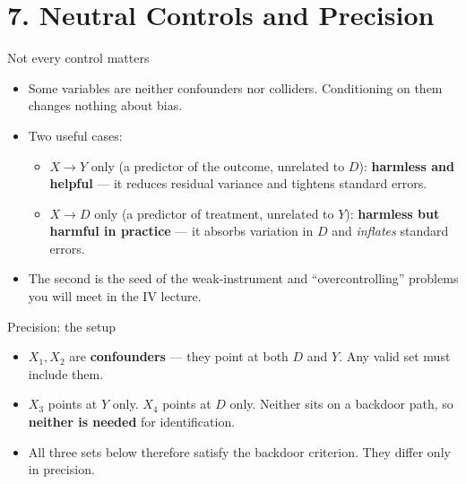 \documentclass[
  11pt,
  ignorenonframetext,
  aspectratio=169,
]{beamer}
\providecommand{\tightlist}{%
  \setlength{\itemsep}{0pt}\setlength{\parskip}{0pt}}
\begin{document}
\section{7. Neutral Controls and
Precision}\label{neutral-controls-and-precision}

\begin{frame}{Not every control matters}
\protect{}\label{not-every-control-matters}
\begin{itemize}
\tightlist
\item
  Some variables are neither confounders nor colliders. Conditioning on
  them changes nothing about bias.
\item
  Two useful cases:

  \begin{itemize}
  \tightlist
  \item
    \(X \to Y\) only (a predictor of the outcome, unrelated to \(D\)):
    \textbf{harmless and helpful} --- it reduces residual variance and
    tightens standard errors.
  \item
    \(X \to D\) only (a predictor of treatment, unrelated to \(Y\)):
    \textbf{harmless but harmful in practice} --- it absorbs variation
    in \(D\) and \emph{inflates} standard errors.
  \end{itemize}
\item
  The second is the seed of the weak-instrument and ``overcontrolling''
  problems you will meet in the IV lecture.
\end{itemize}
\end{frame}

\begin{frame}{Precision: the setup}
\protect{}\label{precision-the-setup}
\begin{center}
\end{center}

\begin{itemize}
\tightlist
\item
  \(X_1, X_2\) are \textbf{confounders} --- they point at both \(D\) and
  \(Y\). Any valid set must include them.
\item
  \(X_3\) points at \(Y\) only. \(X_4\) points at \(D\) only. Neither
  sits on a backdoor path, so \textbf{neither is needed} for
  identification.
\item
  All three sets below therefore satisfy the backdoor criterion. They
  differ only in precision.
\end{itemize}
\end{frame}
\end{document}
